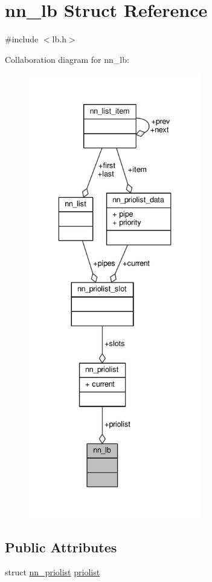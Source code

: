 \hypertarget{structnn__lb}{}\section{nn\+\_\+lb Struct Reference}
\label{structnn__lb}


{\ttfamily \#include $<$lb.\+h$>$}



Collaboration diagram for nn\+\_\+lb\+:\nopagebreak
\begin{figure}[H]
\begin{center}
\leavevmode
\includegraphics[height=550pt]{structnn__lb__coll__graph}
\end{center}
\end{figure}
\subsection*{Public Attributes}
\begin{DoxyCompactItemize}
\item 
struct \hyperlink{structnn__priolist}{nn\+\_\+priolist} \hyperlink{structnn__lb_a2bd049c96526c0c0423611d6a6843926}{priolist}
\end{DoxyCompactItemize}


